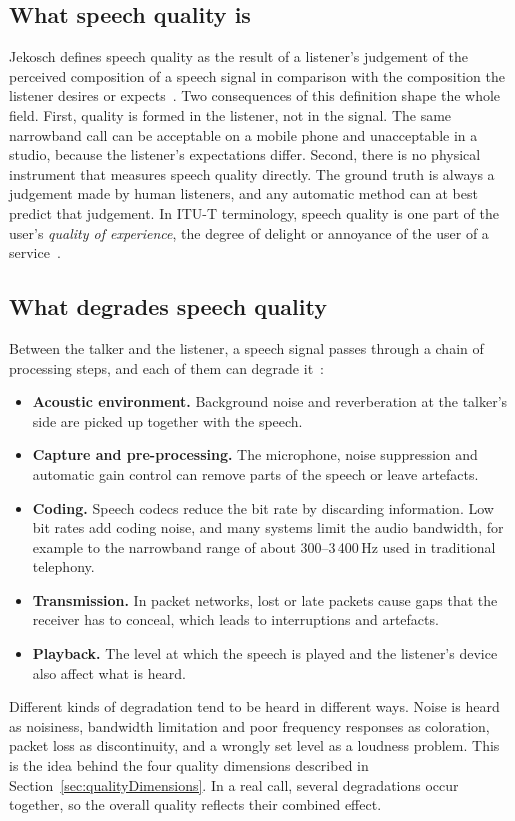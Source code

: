 \documentclass[
english,                 %
bibtex,                  %
includeExtraAbstracts, %
]{kththesis}
\numberwithin{listing}{chapter}
\begin{document}
\subsection{What speech quality is}
\label{sec:whatIsQuality}

Jekosch defines speech quality as the result of a listener's judgement of the perceived composition of a speech signal in comparison with the composition the listener desires or expects~\cite{jekosch_2005}. Two consequences of this definition shape the whole field. First, quality is formed in the listener, not in the signal. The same narrowband call can be acceptable on a mobile phone and unacceptable in a studio, because the listener's expectations differ. Second, there is no physical instrument that measures speech quality directly. The ground truth is always a judgement made by human listeners, and any automatic method can at best predict that judgement. In ITU-T terminology, speech quality is one part of the user's \emph{quality of experience}, the degree of delight or annoyance of the user of a service~\cite{itu_p10}.

\subsection{What degrades speech quality}
\label{sec:degradations}

Between the talker and the listener, a speech signal passes through a chain of processing steps, and each of them can degrade it~\cite{moller_trends_2011}:
\begin{itemize}
\item \textbf{Acoustic environment.} Background noise and reverberation at the talker's side are picked up together with the speech.
\item \textbf{Capture and pre-processing.} The microphone, noise suppression and automatic gain control can remove parts of the speech or leave artefacts.
\item \textbf{Coding.} Speech codecs reduce the bit rate by discarding information. Low bit rates add coding noise, and many systems limit the audio bandwidth, for example to the narrowband range of about 300--3\,400\,Hz used in traditional telephony.
\item \textbf{Transmission.} In packet networks, lost or late packets cause gaps that the receiver has to conceal, which leads to interruptions and artefacts.
\item \textbf{Playback.} The level at which the speech is played and the listener's device also affect what is heard.
\end{itemize}
Different kinds of degradation tend to be heard in different ways. Noise is heard as noisiness, bandwidth limitation and poor frequency responses as coloration, packet loss as discontinuity, and a wrongly set level as a loudness problem. This is the idea behind the four quality dimensions described in Section~\ref{sec:qualityDimensions}. In a real call, several degradations occur together, so the overall quality reflects their combined effect.
\end{document}
